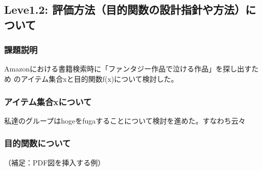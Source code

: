 \subsection{Leve1.2: 評価方法（目的関数の設計指針や方法）について}
\subsubsection{課題説明}
Amazonにおける書籍検索時に「ファンタジー作品で泣ける作品」を探し出すため
のアイテム集合xと目的関数f(x)について検討した。

\subsubsection{アイテム集合xについて}
私達のグループはhogeをfugaすることについて検討を進めた。すなわち云々

\subsubsection{目的関数について}

（補足：PDF図を挿入する例）



